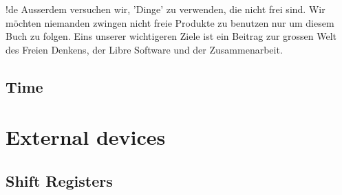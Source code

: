 \documentclass[twoside,12pt,authoryear,openright]{book}
\begin{document}
!de Ausserdem versuchen wir, 'Dinge' zu verwenden, die nicht frei sind. Wir möchten niemanden zwingen nicht freie Produkte zu benutzen nur um diesem Buch zu folgen. Eins unserer wichtigeren Ziele ist ein Beitrag zur grossen Welt des Freien Denkens, der Libre Software und der Zusammenarbeit.










\chapter{Time}




\part{External devices}

\chapter{Shift Registers}


\end{document}
